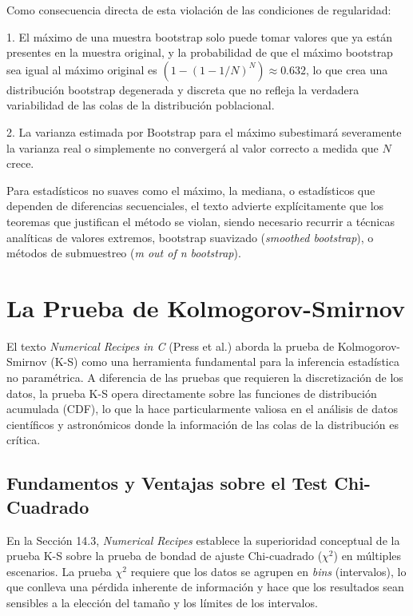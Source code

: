 \documentclass[a4paper]{article}
\begin{document}
Como consecuencia directa de esta violación de las condiciones de regularidad:

1. El máximo de una muestra bootstrap solo puede tomar valores que ya están presentes en la muestra original, y la probabilidad de que el máximo bootstrap sea igual al máximo original es $(1 - (1-1/N)^N) \approx 0.632$, lo que crea una distribución bootstrap degenerada y discreta que no refleja la verdadera variabilidad de las colas de la distribución poblacional.

2. La varianza estimada por Bootstrap para el máximo subestimará severamente la varianza real o simplemente no convergerá al valor correcto a medida que $N$ crece. 

Para estadísticos no suaves como el máximo, la mediana, o estadísticos que dependen de diferencias secuenciales, el texto advierte explícitamente que los teoremas que justifican el método se violan, siendo necesario recurrir a técnicas analíticas de valores extremos, bootstrap suavizado (\textit{smoothed bootstrap}), o métodos de submuestreo (\textit{m out of n bootstrap}).



\section{La Prueba de Kolmogorov-Smirnov}

El texto \textit{Numerical Recipes in C} (Press et al.) aborda la prueba de Kolmogorov-Smirnov (K-S) como una herramienta fundamental para la inferencia estadística no paramétrica. A diferencia de las pruebas que requieren la discretización de los datos, la prueba K-S opera directamente sobre las funciones de distribución acumulada (CDF), lo que la hace particularmente valiosa en el análisis de datos científicos y astronómicos donde la información de las colas de la distribución es crítica.

\subsection{Fundamentos y Ventajas sobre el Test Chi-Cuadrado}

En la Sección 14.3, \textit{Numerical Recipes} establece la superioridad conceptual de la prueba K-S sobre la prueba de bondad de ajuste Chi-cuadrado ($\chi^2$) en múltiples escenarios. La prueba $\chi^2$ requiere que los datos se agrupen en \textit{bins} (intervalos), lo que conlleva una pérdida inherente de información y hace que los resultados sean sensibles a la elección del tamaño y los límites de los intervalos. 
\end{document}
